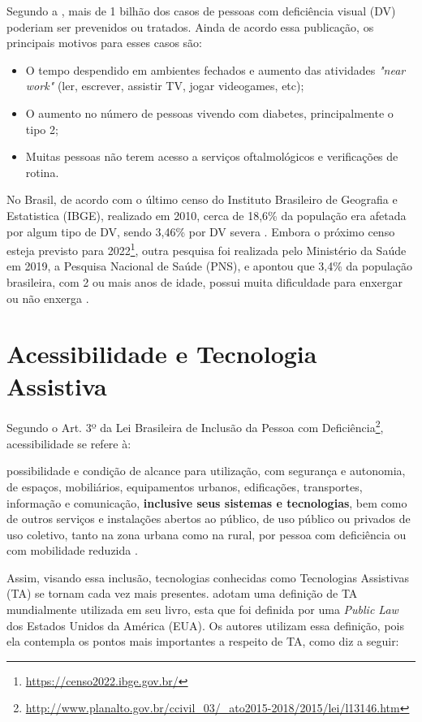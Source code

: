 Segundo a , mais de 1 bilhão dos casos de pessoas com deficiência visual (DV) poderiam ser prevenidos ou
tratados. Ainda de acordo essa publicação, os principais motivos para esses casos são:

\begin{itemize}
    \item O tempo despendido em ambientes fechados e aumento das atividades \textit{"near work"} (ler, escrever, assistir TV, jogar videogames, etc);
    \item O aumento no número de pessoas vivendo com diabetes, principalmente o tipo 2;
    \item Muitas pessoas não terem acesso a serviços oftalmológicos e verificações de rotina.
\end{itemize}

No Brasil, de acordo com o último censo do Instituto Brasileiro de Geografia e Estatistica (IBGE), realizado em 2010,
cerca de 18,6\% da população era afetada por algum tipo de DV, sendo 3,46\% por DV severa
\cite{IBGE2012}. Embora o próximo censo esteja previsto para 2022\footnote{\url{https://censo2022.ibge.gov.br/}}, outra pesquisa
foi realizada pelo Ministério da Saúde em 2019, a Pesquisa Nacional de Saúde (PNS), e apontou que 3,4\% da população brasileira,
com 2 ou mais anos de idade, possui muita dificuldade para enxergar ou não enxerga \cite{stopa2020pesquisa}.

\section{Acessibilidade e Tecnologia Assistiva}

Segundo o Art. 3º da Lei Brasileira de Inclusão da Pessoa com Deficiência\footnote{\url{http://www.planalto.gov.br/ccivil_03/_ato2015-2018/2015/lei/l13146.htm}},
acessibilidade se refere à:

\begin{citacao}
    possibilidade e condição de alcance para utilização, com segurança e autonomia, de espaços, mobiliários, equipamentos urbanos,
    edificações, transportes, informação e comunicação, \textbf{inclusive seus sistemas e tecnologias}, bem como de outros serviços e
    instalações abertos ao público, de uso público ou privados de uso coletivo, tanto na zona urbana como na rural, por pessoa com
    deficiência ou com mobilidade reduzida \cite{Brasil2015}.
\end{citacao}

Assim, visando essa inclusão, tecnologias conhecidas como Tecnologias Assistivas (TA) se tornam cada vez mais presentes.
 adotam uma definição de TA mundialmente utilizada em seu livro, esta que foi definida por uma \textit{Public Law}
dos Estados Unidos da América (EUA). Os autores utilizam essa definição, pois ela contempla os pontos mais
importantes a respeito de TA, como diz a seguir:


